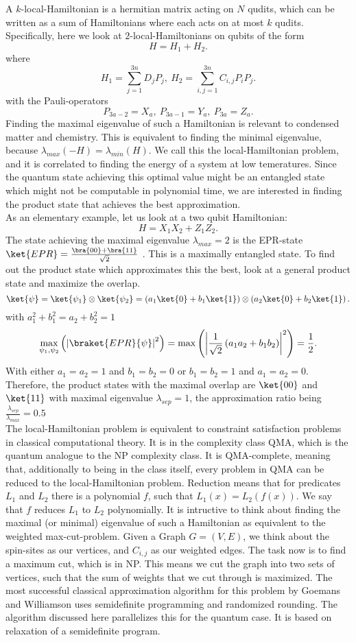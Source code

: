 A $k$-local-Hamiltonian is a hermitian matrix acting on $N$ qudits, which can be written as a sum of Hamiltonians where each acts on at most $k$ qudits.
Specifically, here we look at  $2$-local-Hamiltonians on qubits of the form \[
H = H_1+H_2
.\]
where \[
	H_1 = \sum_{j=1}^{3n} D_jP_j, ~ H_2  = \sum_{i,j=1}^{3n} C_{i,j}P_iP_j
.\]
with the Pauli-operators \[
	P_{3a-2}=X_a, ~ P_{3a-1}=Y_a, ~ P_{3a}=Z_a
.\]
Finding the maximal eigenvalue of such a Hamiltonian is relevant to condensed matter and chemistry.
This is equivalent to finding the minimal eigenvalue, because $\lambda_{max}(-H)=\lambda_{min}(H)$. \cite{gharibian19}
We call this the local-Hamiltonian problem, and it is correlated to finding the energy of a system at low temeratures.
Since the quantum state achieving this optimal value might be an entangled state which might not be computable in polynomial time, we are interested in finding the product state that achieves the best approximation. \\
As an elementary example, let us look at a two qubit Hamiltonian: \[
H=X_1X_2+Z_1Z_2
.\]
The state achieving the maximal eigenvalue $\lambda_{max}=2$ is the EPR-state $\ket{EPR}=\frac{\bra{00}+\bra{11}}{\sqrt{2}}$ .
This is a maximally entangled state.
To find out the product state which approximates this the best, look at a general product state and maximize the overlap.
\[
	\ket{\psi}=\ket{\psi_1}\otimes\ket{\psi_2}=\left(a_1\ket{0}+b_1\ket{1}\right)\otimes\left(a_2\ket{0}+b_2\ket{1}\right)
.\] with $a_1^2+b_1^2=a_2+b_2^2=1$
\[
\max_{\psi_1,\psi_2}\left(\left|\braket{EPR}{\psi}\right|^2\right)=\max\left(\left|\frac{1}{\sqrt{2}}\left(a_1a_2+b_1b_2\right)\right|^2\right)=\frac{1}{2}
.\]
With either $a_1=a_2=1$ and $b_1=b_2=0$ or $b_1=b_2=1$ and $a_1=a_2=0$.
Therefore, the product states with the maximal overlap are $\ket{00}$ and $\ket{11}$ with maximal eigenvalue $\lambda_{sep}=1$, the approximation ratio being  $\frac{\lambda_{sep}}{\lambda_{max}} = 0.5 $\\
The local-Hamiltonian problem is equivalent to constraint satisfaction problems in classical computational theory.
It is in the complexity class QMA, which is the quantum analogue to the NP complexity class.
It is QMA-complete, meaning that, additionally to being in the class itself, every problem in QMA can be reduced to the local-Hamiltonian problem.\cite{kempe06}
Reduction means that for predicates $L_1$ and $L_2$ there is a polynomial $f$, such that $L_1(x)=L_2(f(x))$.
We say that $f$ reduces  $L_1$ to $L_2$ polynomially.\cite{kitaev02}
It is intructive to think about finding the maximal (or minimal) eigenvalue of such a Hamiltonian as equivalent to the weighted max-cut-problem.
Given a Graph $G=(V,E)$, we think about the spin-sites as our vertices, and $C_{i,j}$ as our weighted edges.
The task now is to find a maximum cut, which is in NP.
This means we cut the graph into two sets of vertices, such that the sum of weights that we cut through is maximized.
The most successful classical approximation algorithm for this problem by Goemans and Williamson uses semidefinite programming and randomized rounding. \cite{goemans95}
The algorithm discussed here parallelizes this for the quantum case.
It is based on relaxation of a semidefinite program.
